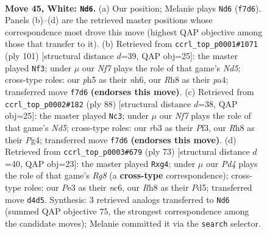 \documentclass[11pt]{article}
\begin{document}
\clearpage

\begin{figure}[p]\centering
\begin{subfigure}{0.46\textwidth}\centering
\resizebox{\linewidth}{!}{%
\newchessgame
\chessboard[
  setfen={7R/5Np1/4ppk1/1p5p/3P1P1P/1r2P1PK/8/8 w - - 10 45},
  showmover=false,
  pgfstyle=straightmove, color=movearrow, markmove={f7-d6}
]}
\caption{}
\end{subfigure}\hfill
\begin{subfigure}{0.46\textwidth}\centering
\resizebox{\linewidth}{!}{%
\newchessgame
\chessboard[
  setfen={8/6k1/4p1pN/p1p2pP1/P1Pn1P1P/3K4/3P4/8 b - - 0 51},
  showmover=false,
  pgfstyle=straightmove, color=movearrow, markmove={d4-f3}
]}
\caption{}
\end{subfigure}
\\[4pt]
\begin{subfigure}{0.46\textwidth}\centering
\resizebox{\linewidth}{!}{%
\newchessgame
\chessboard[
  setfen={8/3b2p1/4kp1p/1p1Np2P/1P2P1P1/5PK1/8/8 w - - 7 45},
  showmover=false,
  pgfstyle=straightmove, color=movearrow, markmove={d5-c3}
]}
\caption{}
\end{subfigure}\hfill
\begin{subfigure}{0.46\textwidth}\centering
\resizebox{\linewidth}{!}{%
\newchessgame
\chessboard[
  setfen={8/5pk1/2N3p1/p2pP3/1p2nPP1/4K3/PP2R3/6r1 b - - 7 37},
  showmover=false,
  pgfstyle=straightmove, color=movearrow, markmove={g1-g4}
]}
\caption{}
\end{subfigure}
\caption{\textbf{Move 45, White: \texttt{Nd6}.} (a) Our position; Melanie plays \texttt{Nd6} (\texttt{f7d6}). Panels (b)--(d) are the retrieved master positions whose correspondence most drove this move (highest QAP objective among those that transfer to it). (b) Retrieved from \texttt{ccrl\_top\_p0001\#1071} (ply 101) [structural distance $d$=39, QAP obj=25]: the master played \texttt{Nf3}; under $\mu$ our \emph{Nf7} plays the role of that game's \emph{Nd5}; cross-type roles: our \emph{p}h5 as their \emph{n}h6, our \emph{R}h8 as their \emph{p}a4; transferred move \texttt{f7d6} \textbf{(endorses this move)}. (c) Retrieved from \texttt{ccrl\_top\_p0002\#182} (ply 88) [structural distance $d$=38, QAP obj=25]: the master played \texttt{Nc3}; under $\mu$ our \emph{Nf7} plays the role of that game's \emph{Nd5}; cross-type roles: our \emph{r}b3 as their \emph{P}f3, our \emph{R}h8 as their \emph{P}g4; transferred move \texttt{f7d6} \textbf{(endorses this move)}. (d) Retrieved from \texttt{ccrl\_top\_p0003\#679} (ply 73) [structural distance $d$=40, QAP obj=23]: the master played \texttt{Rxg4}; under $\mu$ our \emph{Pd4} plays the role of that game's \emph{Rg8} (a \textbf{cross-type} correspondence); cross-type roles: our \emph{P}e3 as their \emph{n}c6, our \emph{R}h8 as their \emph{P}d5; transferred move \texttt{d4d5}. Synthesis: 3 retrieved analogs transferred to \texttt{Nd6} (summed QAP objective 75, the strongest correspondence among the candidate moves); Melanie committed it via the \texttt{search} selector.}
\label{fig:thought-m88}
\end{figure}
\end{document}
